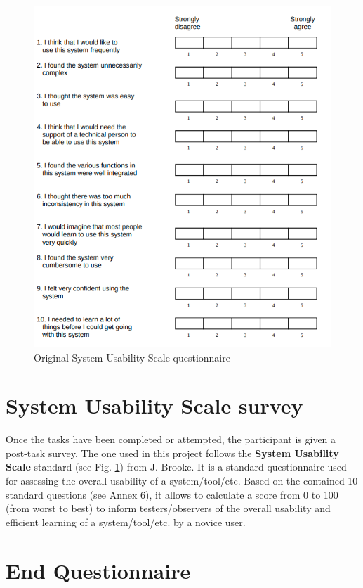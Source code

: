 \documentclass[twocolumn, letterpaper,13pt]{scrartcl}
\begin{document}
    \begin{figure}	\includegraphics[width=0.98\linewidth]{SUS.png}
    \caption{Original System Usability Scale questionnaire\label{fig:a}}
    \end{figure}

    \section*{System Usability Scale survey}
    
    Once the tasks have been completed or attempted, the participant is given a post-task survey. The one used in this project follows the \textbf{System Usability Scale} standard (see Fig. \ref{fig:a}) from J. Brooke\cite{brook}. It is a standard questionnaire used for assessing the overall usability of a system/tool/etc. Based on the contained 10 standard questions (see Annex 6), it allows to calculate a score from 0 to 100 (from worst to best) to inform testers/observers of the overall usability and efficient learning of a system/tool/etc. by a novice user.
    
    \section*{End Questionnaire}
    
\end{document}
